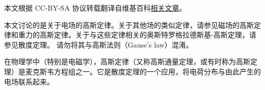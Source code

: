 
本文根据 CC-BY-SA 协议转载翻译自维基百科\href{https://en.wikipedia.org/wiki/Conservation_of_energy}{相关文章}。

本文讨论的是关于电场的高斯定律。关于其他场的类似定律，请参见磁场的高斯定律和重力的高斯定律。关于与这些定律相关的奥斯特罗格拉德斯基-高斯定理，请参见散度定理。  
请勿将其与高斯法则（Gause's law）混淆。

在物理学中（特别是电磁学），高斯定律（又称高斯通量定理，或有时称为高斯定理）是麦克斯韦方程组之一。它是散度定理的一个应用，将电荷分布与由此产生的电场联系起来。